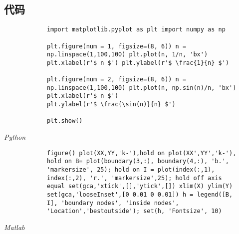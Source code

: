 \documentclass[a4paper, 12pt, UTF8]{ctexart}
\begin{document}
\begin{appendices}
    \section{代码}
    \begin{listing}[ht]
        \begin{verbatim}
            import matplotlib.pyplot as plt import numpy as np
    
            plt.figure(num = 1, figsize=(8, 6)) n =
            np.linspace(1,100,100) plt.plot(n, 1/n, 'bx')
            plt.xlabel(r'$ n $') plt.ylabel(r'$ \frac{1}{n} $')
    
            plt.figure(num = 2, figsize=(8, 6)) n =
            np.linspace(1,100,100) plt.plot(n, np.sin(n)/n, 'bx')
            plt.xlabel(r'$ n $')
            plt.ylabel(r'$ \frac{\sin(n)}{n} $')
    
            plt.show()
        \end{verbatim}
        \caption{\em Python}
    \end{listing}

    \begin{listing}[ht]
        \begin{verbatim}
            figure() plot(XX,YY,'k-'),hold on plot(XX',YY','k-'),
            hold on B= plot(boundary(3,:), boundary(4,:), 'b.',
            'markersize', 25); hold on I = plot(index(:,1),
            index(:,2), 'r.', 'markersize',25); hold off axis
            equal set(gca,'xtick',[],'ytick',[]) xlim(X) ylim(Y)
            set(gca,'looseInset',[0 0.01 0 0.01]) h = legend([B,
            I], 'boundary nodes', 'inside nodes',
            'Location','bestoutside'); set(h, 'Fontsize', 10)
        \end{verbatim}
        \caption{\em Matlab}
    \end{listing}
\end{appendices}
\end{document}
